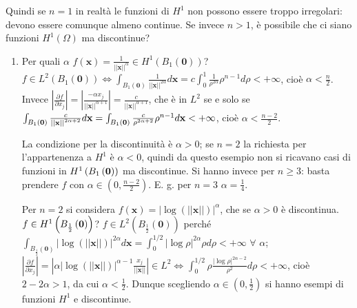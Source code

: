 \documentclass{article}
\begin{document}
Quindi se $n=1$ in realt\`{a} le funzioni di $H^{1}$ non possono essere
troppo irregolari: devono essere comunque almeno continue. Se invece $n>1$, 
\`{e} possibile che ci siano funzioni $H^{1}\left( \Omega \right) $ ma
discontinue?

\begin{enumerate}
\item Per quali $\alpha $ $f\left( \mathbf{x}\right) =\frac{1}{\left\vert
\left\vert \mathbf{x}\right\vert \right\vert ^{\alpha }}\in H^{1}\left(
B_{1}\left( \mathbf{0}\right) \right) $? $f\in L^{2}\left( B_{1}\left( 
\mathbf{0}\right) \right) \Longleftrightarrow \int_{B_{1}\left( \mathbf{0}%
\right) }\frac{1}{\left\vert \left\vert \mathbf{x}\right\vert \right\vert
^{2\alpha }}d\mathbf{x}=c\int_{0}^{1}\frac{1}{\rho ^{2\alpha }}\rho
^{n-1}d\rho <+\infty $, cio\`{e} $\alpha <\frac{n}{2}$. Invece $\left\vert 
\frac{\partial f}{\partial x_{j}}\right\vert =\left\vert \frac{-\alpha x_{j}%
}{\left\vert \left\vert \mathbf{x}\right\vert \right\vert ^{\alpha +1}}%
\right\vert =\frac{c}{\left\vert \left\vert \mathbf{x}\right\vert
\right\vert ^{\alpha +1}}$, che \`{e} in $%
L^{2}$ se e solo se $\int_{B_{1}\left( \mathbf{0}\right) }\frac{c}{%
\left\vert \left\vert \mathbf{x}\right\vert \right\vert ^{2\alpha +2}}d%
\mathbf{x}=\int_{B_{1}\left( \mathbf{0}\right) }\frac{c}{\rho ^{2\alpha +2}}%
\rho ^{n-1}d\mathbf{x<+\infty }$, cio\`{e} $\alpha <\frac{n-2}{2}$.

La condizione per la discontinuit\`{a} \`{e} $\alpha >0$; se $n=2$ la
richiesta per l'appartenenza a $H^{1}$ \`{e} $\alpha <0$, quindi da questo
esempio non si ricavano casi di funzioni in $H^{1}\left( B_{1}\left( \mathbf{%
0}\right) \right) $ ma discontinue. Si hanno invece per $n\geq 3$: basta
prendere $f$ con $\alpha \in \left( 0,\frac{n-2}{2}\right) $. E. g. per $n=3$
$\alpha =\frac{1}{4}$.

Per $n=2$ si considera $f\left( \mathbf{x}\right) =\left\vert \log \left(
\left\vert \left\vert \mathbf{x}\right\vert \right\vert \right) \right\vert
^{\alpha }$, che se $\alpha >0$ \`{e} discontinua. $f\in H^{1}\left( B_{%
\frac{1}{2}}\left( \mathbf{0}\right) \right) $? $f\in L^{2}\left( B_{\frac{1%
}{2}}\left( \mathbf{0}\right) \right) $ perch\'{e} $\int_{B_{\frac{1}{2}%
}\left( \mathbf{0}\right) }\left\vert \log \left( \left\vert \left\vert 
\mathbf{x}\right\vert \right\vert \right) \right\vert ^{2\alpha }d\mathbf{x}%
=\int_{0}^{1/2}\left\vert \log \rho \right\vert ^{2\alpha }\rho d\rho
<+\infty $ $\forall $ $\alpha $; $\left\vert \frac{\partial f}{\partial x_{j}%
}\right\vert =\left\vert \alpha \left\vert \log \left( \left\vert \left\vert 
\mathbf{x}\right\vert \right\vert \right) \right\vert ^{\alpha -1}\frac{x_{j}%
}{\left\vert \left\vert \mathbf{x}\right\vert \right\vert }\right\vert \in
L^{2}\Longleftrightarrow ^{}\int_{0}^{1/2}\rho \frac{\left\vert \log
\rho \right\vert ^{2\alpha -2}}{\rho ^{2}}d\rho <+\infty $, cio\`{e} $%
2-2\alpha >1$, da cui $\alpha <\frac{1}{2}$. Dunque scegliendo $\alpha \in
\left( 0,\frac{1}{2}\right) $ si hanno esempi di funzioni $H^{1}$ e
discontinue.


\end{enumerate}
\end{document}
